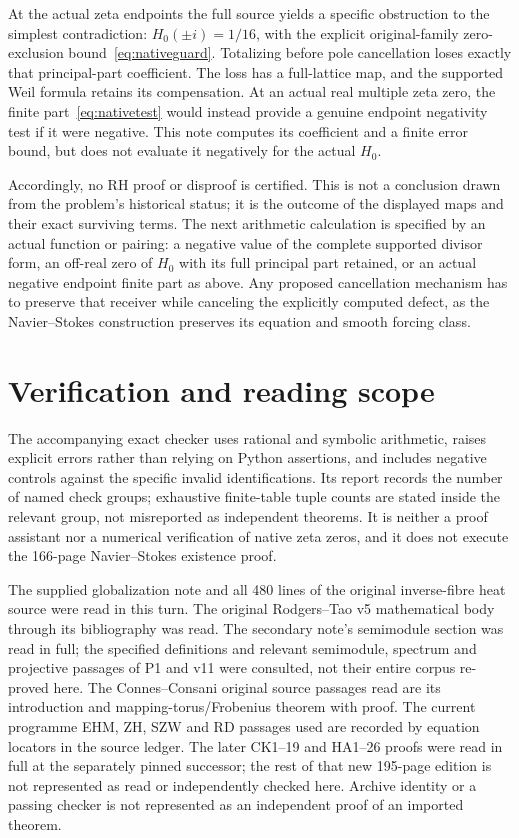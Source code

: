 \documentclass[11pt,a4paper]{article}
\theoremstyle{definition}\newtheorem{definition}[theorem]{Definition}\newtheorem{remark}[theorem]{Remark}
\begin{document}
At the actual zeta endpoints the full source yields a specific obstruction to the simplest contradiction: $H_0(\pm i)=1/16$, with the explicit original-family zero-exclusion bound~\eqref{eq:nativeguard}. Totalizing before pole cancellation loses exactly that principal-part coefficient. The loss has a full-lattice map, and the supported Weil formula retains its compensation. At an actual real multiple zeta zero, the finite part~\eqref{eq:nativetest} would instead provide a genuine endpoint negativity test if it were negative. This note computes its coefficient and a finite error bound, but does not evaluate it negatively for the actual $H_0$.

Accordingly, no RH proof or disproof is certified. This is not a conclusion drawn from the problem's historical status; it is the outcome of the displayed maps and their exact surviving terms. The next arithmetic calculation is specified by an actual function or pairing: a negative value of the complete supported divisor form, an off-real zero of $H_0$ with its full principal part retained, or an actual negative endpoint finite part as above. Any proposed cancellation mechanism has to preserve that receiver while canceling the explicitly computed defect, as the Navier--Stokes construction preserves its equation and smooth forcing class.

\section*{Verification and reading scope}
The accompanying exact checker uses rational and symbolic arithmetic, raises explicit errors rather than relying on Python assertions, and includes negative controls against the specific invalid identifications. Its report records the number of named check groups; exhaustive finite-table tuple counts are stated inside the relevant group, not misreported as independent theorems. It is neither a proof assistant nor a numerical verification of native zeta zeros, and it does not execute the 166-page Navier--Stokes existence proof.

The supplied globalization note and all 480 lines of the original inverse-fibre heat source were read in this turn. The original Rodgers--Tao v5 mathematical body through its bibliography was read. The secondary note's semimodule section was read in full; the specified definitions and relevant semimodule, spectrum and projective passages of P1 and v11 were consulted, not their entire corpus re-proved here. The Connes--Consani original source passages read are its introduction and mapping-torus/Frobenius theorem with proof. The current programme EHM, ZH, SZW and RD passages used are recorded by equation locators in the source ledger. The later CK1--19 and HA1--26 proofs were read in full at the separately pinned successor; the rest of that new 195-page edition is not represented as read or independently checked here. Archive identity or a passing checker is not represented as an independent proof of an imported theorem.
\end{document}
